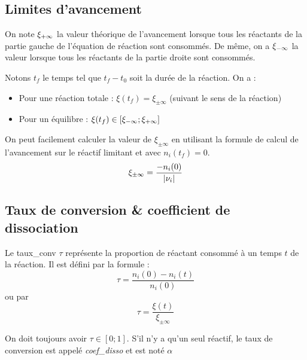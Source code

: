\subsection{Limites d'avancement}
On note $\xi_{+\infty}$ la valeur théorique de l'avancement lorsque tous les réactants de la partie gauche de l'équation de réaction sont consommés.
De même, on a $\xi_{-\infty}$ la valeur lorsque tous les réactants de la partie droite sont consommés.

Notons $t_f$ le temps tel que $t_f - t_0$ soit la durée de la réaction. On a :
\begin{itemize}
	\item Pour une réaction totale : $\xi(t_f) = \xi_{\pm\infty}$ (suivant le sens de la réaction)
	\item Pour un équilibre : $\xi(t_f) \in [\xi_{-\infty} ; \xi_{+\infty}]$
\end{itemize}

On peut facilement calculer la valeur de $\xi_{\pm\infty}$ en utilisant la formule de calcul de l'avancement sur le réactif limitant et avec $n_i(t_f)=0$.
$$\xi_{\pm\infty}=\frac{-n_i(0)}{|\nu_i|}$$

\subsection{Taux de conversion \& coefficient de dissociation}
Le \gls{taux_conv} $\tau$ représente la proportion de réactant consommé à un temps $t$ de la réaction. Il est défini par la formule :
$$\tau=\frac{n_i(0)-n_i(t)}{n_i(0)}$$
ou par
$$\tau=\frac{\xi(t)}{\xi_{\pm\infty}}$$

On doit toujours avoir $\tau\in[0;1]$. S'il n'y a qu'un seul réactif, le taux de conversion est appelé \emph{\gls{coef_disso}} et est noté $\alpha$